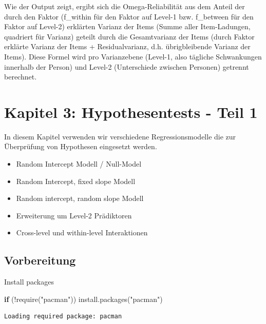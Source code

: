 \documentclass[
  letterpaper,
  DIV=11,
  numbers=noendperiod]{scrreprt}
\newenvironment{Shaded}{\begin{snugshade}}{\end{snugshade}}
\newcommand{\ControlFlowTok}[1]{\textcolor[rgb]{0.00,0.23,0.31}{\textbf{#1}}}
\newcommand{\FunctionTok}[1]{\textcolor[rgb]{0.28,0.35,0.67}{#1}}
\newcommand{\NormalTok}[1]{\textcolor[rgb]{0.00,0.23,0.31}{#1}}
\newcommand{\SpecialCharTok}[1]{\textcolor[rgb]{0.37,0.37,0.37}{#1}}
\newcommand{\StringTok}[1]{\textcolor[rgb]{0.13,0.47,0.30}{#1}}
\providecommand{\tightlist}{%
  \setlength{\itemsep}{0pt}\setlength{\parskip}{0pt}}\usepackage{longtable,booktabs,array}
\begin{document}
Wie der Output zeigt, ergibt sich die Omega-Reliabilität aus dem Anteil
der durch den Faktor (f\_within für den Faktor auf Level-1 bzw.
f\_between für den Faktor auf Level-2) erklärten Varianz der Items
(Summe aller Item-Ladungen, quadriert für Varianz) geteilt durch die
Gesamtvarianz der Items (durch Faktor erklärte Varianz der Items +
Residualvarianz, d.h. übrigbleibende Varianz der Items). Diese Formel
wird pro Varianzebene (Level-1, also tägliche Schwankungen innerhalb der
Person) und Level-2 (Unterschiede zwischen Personen) getrennt berechnet.


\chapter{Kapitel 3: Hypothesentests - Teil
1}\label{kapitel-3-hypothesentests---teil-1}

In diesem Kapitel verwenden wir verschiedene Regressionsmodelle die zur
Überprüfung von Hypothesen eingesetzt werden.

\begin{itemize}
\tightlist
\item
  Random Intercept Modell / Null-Model
\item
  Random Intercept, fixed slope Modell
\item
  Random intercept, random slope Modell
\item
  Erweiterung um Level-2 Prädiktoren
\item
  Cross-level und within-level Interaktionen
\end{itemize}

\section{Vorbereitung}\label{vorbereitung}

Install packages

\begin{Shaded}
\begin{Highlighting}[]
\ControlFlowTok{if}\NormalTok{ (}\SpecialCharTok{!}\FunctionTok{require}\NormalTok{(}\StringTok{"pacman"}\NormalTok{)) }\FunctionTok{install.packages}\NormalTok{(}\StringTok{"pacman"}\NormalTok{)}
\end{Highlighting}
\end{Shaded}

\begin{verbatim}
Loading required package: pacman
\end{verbatim}
\end{document}
